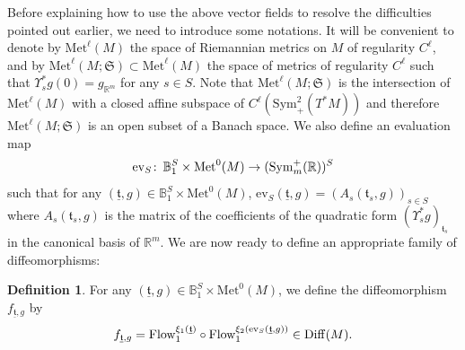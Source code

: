 \documentclass{article}
\numberwithin{equation}{section}        %
\theoremstyle{bfnote}
\theoremstyle{definition}
\newtheorem{Def}[thm]{Definition}           %
\theoremstyle{bfremark}
\newcommand{\col}{\colon \thinspace}        %
\newcommand{\R}{\mathbb{R}}                 %
\newcommand{\Ball}{\mathbb{B}}              %
\newcommand{\Met}{\mathrm{Met}}             %
\begin{document}
Before explaining how to use the above vector fields to resolve the difficulties pointed out earlier, we need to introduce some notations. It will be convenient to denote by $\Met^{\ell}(M)$ the space of Riemannian metrics on $M$ of regularity $C^{\ell}$, and by $\Met^\ell(M;\mathfrak{S}) \subset \Met^\ell(M)$ the space of metrics of regularity $C^\ell$ such that $\Upsilon_s^* g(0) = g_{\R^m}$ for any $s \in S$. Note that $\Met^\ell(M;\mathfrak{S})$ is the intersection of $\Met^\ell(M)$ with a closed affine subspace of $C^\ell(\mathrm{Sym}^2_+(T^*M))$ and therefore $\Met^\ell(M;\mathfrak{S})$ is an open subset of a Banach space. We also define an evaluation map
\begin{equation*}
    \mathrm{ev}_S \col \Ball_1^S \times \Met^0(M) \to (\mathrm{Sym}^+_m(\R))^S
\end{equation*}
such that for any $(\underline{\mathfrak{t}},g) \in \Ball_1^S \times \Met^0(M)$, $\mathrm{ev}_S(\underline{\mathfrak{t}},g) = (A_s(\mathfrak{t}_s,g))_{s \in S}$ where $A_s(\mathfrak{t}_s,g)$ is the matrix of the coefficients of the quadratic form $(\Upsilon_s^*g)_{\mathfrak{t}_s}$ in the canonical basis of $\R^m$. We are now ready to define an appropriate family of diffeomorphisms:

\begin{Def}     \label{Def: diffeos f}
    For any $(\underline{\mathfrak{t}},g) \in \Ball_1^S \times \Met^0(M)$, we define the diffeomorphism $f_{\underline{\mathfrak{t}},g}$ by
    \begin{equation*}
        f_{\underline{\mathfrak{t}},g} = \textup{Flow}_1^{\xi_1(\underline{\mathfrak{t}})} \circ \textup{Flow}_1^{\xi_2(\mathrm{ev}_S(\underline{\mathfrak{t}},g))} \in \mathrm{Diff}(M).
    \end{equation*}
\end{Def}
\end{document}
